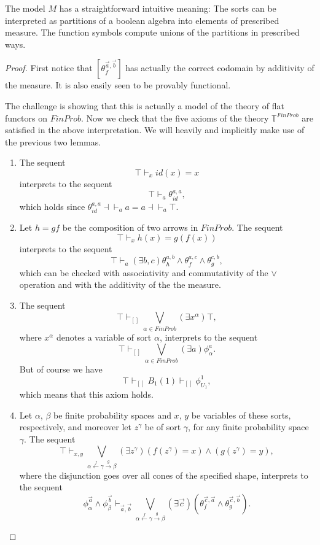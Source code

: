 \documentclass[a4paper]{amsproc}
\theoremstyle{plain}
\theoremstyle{definition}
\theoremstyle{remark}
\numberwithin{equation}{section}
\begin{document}
The model $M$ has a straightforward intuitive meaning: The sorts can be interpreted as partitions of a boolean algebra into elements of prescribed measure. The function symbols compute unions of the partitions in prescribed ways.

\begin{proof}
First notice that $[\theta_f^{\vec{a}, \vec{b}}]$ has actually the correct codomain by additivity of the measure. It is also easily seen to be provably functional.

The challenge is showing that this is actually a model of the theory of flat functors on $FinProb$.  Now we check that the five axioms of the theory $\mathbb{T}^{FinProb}$ are satisfied in the above interpretation. We will heavily and implicitly make use of the previous two lemmas.
\begin{enumerate}
\item The sequent
\[
\top \vdash_x id(x) = x
\]
interprets to the sequent
\[
\top \vdash_a \theta_{id}^{a,a} ,
\]
which holds since $\theta_{id}^{a,a} \dashv \vdash_a a = a \dashv \vdash_a \top$.

\item Let $h = g f$ be the composition of two arrows in $FinProb$. The sequent
\[
\top \vdash_x h(x) = g(f(x))
\]
interprets to the sequent
\[
\top \vdash_a (\exists b, c) \theta^{a,b}_h \wedge \theta^{a,c}_f \wedge \theta^{c,b}_g ,
\]
which can be checked with associativity and commutativity of the $\vee$ operation and with the additivity of the the measure.

\item The sequent
\[
\top \vdash_{[]} \bigvee_{\alpha \in FinProb} (\exists x^{\alpha}) \top ,
\]
where $x^{\alpha}$ denotes a variable of sort $\alpha$, interprets to the sequent
\[
\top \vdash_{[]} \bigvee_{\alpha \in FinProb} (\exists a) \phi_{\alpha}^a .
\]
But of course we have
\[
\top \vdash_{[]} B_1(1) \vdash_{[]} \phi^1_{U_1} ,
\]
which means that this axiom holds.

\item Let $\alpha$, $\beta$ be finite probability spaces and $x$, $y$ be variables of these sorts, respectively, and moreover let $z^{\gamma}$ be of sort $\gamma$, for any finite probability space $\gamma$. The sequent
\[
\top \vdash_{x,y} \bigvee_{\alpha \xleftarrow{f} \gamma \xrightarrow{g} \beta} (\exists z^{\gamma}) (f(z^{\gamma}) = x) \wedge (g(z^{\gamma}) = y) ,
\]
where the disjunction goes over all cones of the specified shape, interprets to the sequent
\[
\phi^{\vec{a}}_{\alpha} \wedge \phi^{\vec{b}}_{\beta} \vdash_{\vec{a}, \vec{b}} \bigvee_{\alpha \xleftarrow{f} \gamma \xrightarrow{g} \beta} (\exists \vec{c})(\theta_f^{\vec{c},\vec{a}} \wedge \theta_g^{\vec{c},\vec{b}}) .
\]


\end{enumerate}
\end{proof}
\end{document}
